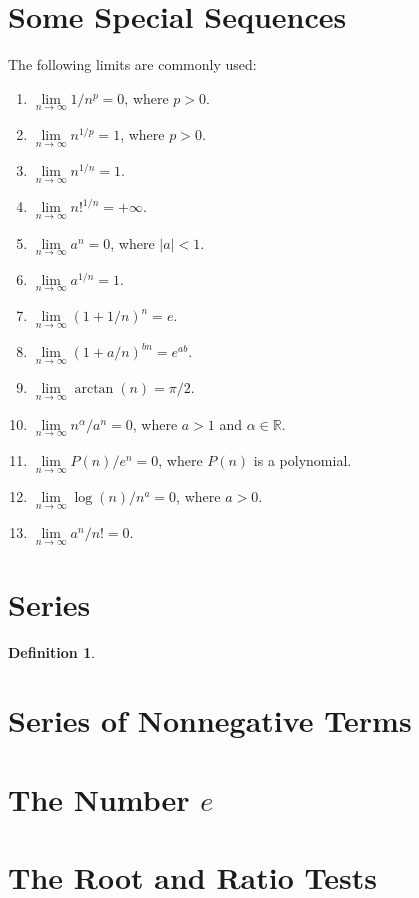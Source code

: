 \documentclass[a4paper,12pt]{report}
\newcommand{\R}{\mathbb{R}}
\theoremstyle{plain}
\theoremstyle{definition}
\newtheorem{definition}[theorem]{\color{red}Definition} %
\theoremstyle{remark}
\begin{document}
\section{Some Special Sequences}
The following limits are commonly used:
\begin{enumerate}
\item $\lim\limits_{n\to\infty}1/n^p=0$, where $p>0$.
\item $\lim\limits_{n\to\infty}n^{1/p}=1$, where $p>0$.
\item $\lim\limits_{n\to\infty} n^{1/n}=1$.
\item $\lim\limits_{n\to\infty} n!^{1/n} = +\infty$.
\item $\lim\limits_{n\to\infty} a^n=0$, where $|a|<1$.
\item $\lim\limits_{n\to\infty} a^{1/n} = 1$.
\item $\lim\limits_{n\to\infty} (1+1/n)^n = e$.
\item $\lim\limits_{n\to\infty} (1+a/n)^{bn}  = e^{ab}$.
\item $\lim\limits_{n\to\infty} \arctan(n)=\pi/2$.
\item $\lim\limits_{n\to\infty} n^\alpha/a^n=0$, where $a>1$ and $\alpha\in\R$.
\item $\lim\limits_{n\to\infty} P(n)/e^n = 0$, where $P(n)$ is a polynomial.
\item $\lim\limits_{n\to\infty} \log(n)/n^a = 0$, where $a>0$.
\item $\lim\limits_{n\to\infty} a^n/n! = 0$.
\end{enumerate}
\section{Series}
\begin{definition}
\end{definition}

\section{Series of Nonnegative Terms}

\section{The Number $e$}

\section{The Root and Ratio Tests}
\end{document}
